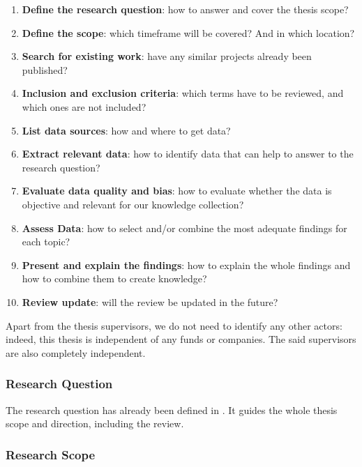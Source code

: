 \begin{enumerate}
    \item \textbf{Define the research question}: how to answer and cover the thesis scope?
    \item \textbf{Define the scope}: which timeframe will be covered? And in which location?
    \item \textbf{Search for existing work}: have any similar projects already been published?
    \item \textbf{Inclusion and exclusion criteria}: which terms have to be reviewed, and which ones are not included? 
    \item \textbf{List data sources}: how and where to get data?
    \item \textbf{Extract relevant data}: how to identify data that can help to answer to the research question?
    \item \textbf{Evaluate data quality and bias}: how to evaluate whether the data is objective and relevant for our knowledge collection?
    \item \textbf{Assess Data}: how to select and/or combine the most adequate findings for each topic?
    \item \textbf{Present and explain the findings}: how to explain the whole findings and how to combine them to create knowledge?
    \item \textbf{Review update}: will the review be updated in the future?
\end{enumerate}

Apart from the thesis supervisors, we do not need to identify any other actors: indeed, this thesis is independent of any funds or companies. The said supervisors are also completely independent.

\subsubsection{Research Question}
\label{subsubsec:state_methodology_approach_question}

The research question has already been defined in . It guides the whole thesis scope and direction, including the review. 

\subsubsection{Research Scope}
\label{subsubsec:state_methodology_approach_scope}

